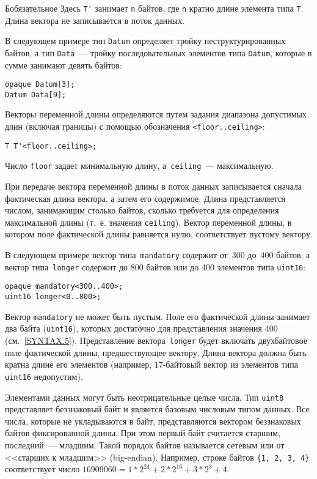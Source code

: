 \begin{appendix}{Б}{обязательное}
Здесь \lstinline{T'} занимает \lstinline{n} байтов, где \lstinline{n} 
кратно длине элемента типа \lstinline{T}. Длина вектора не записывается в 
поток данных.  

В следующем примере тип \lstinline{Datum} определяет тройку неструктурированных
байтов, а тип \lstinline{Data}~--- тройку последовательных элементов типа 
\lstinline{Datum}, которые в сумме занимают девять байтов:  
\begin{lstlisting}
opaque Datum[3];
Datum Data[9];
\end{lstlisting}

Векторы переменной длины определяются путем задания диапазона допустимых 
длин (включая границы) с помощью обозначения \lstinline{<floor..ceiling>}: 
\begin{lstlisting}
T T'<floor..ceiling>;
\end{lstlisting}

Число \lstinline{floor} задает минимальную длину, 
а~\lstinline{ceiling}~--- максимальную.  

При передаче вектора переменной длины в поток данных записывается сначала 
фактическая длина вектора, а затем его содержимое. Длина представляется 
числом, занимающим столько байтов, сколько требуется для определения 
максимальной длины (т.~е. значения \lstinline{ceiling}). Вектор переменной 
длины, в котором поле фактической длины равняется нулю, соответствует 
пустому вектору. 

В следующем примере вектор типа~\lstinline{mandatory} содержит от~300 
до~400 байтов, а вектор типа~\lstinline{longer} содержит до 800 байтов 
или до 400 элементов типа \lstinline{uint16}:
\begin{lstlisting}
opaque mandatory<300..400>;
uint16 longer<0..800>;
\end{lstlisting}

Вектор \lstinline{mandatory} не может быть пустым. 
Поле его фактической длины занимает два байта (\lstinline{uint16}), 
которых достаточно для  представления значения 400 (см.~\ref{SYNTAX.5}). 
%
Представление вектора~\lstinline{longer} будет включать 
двухбайтовое поле фактической длины, предшествующее вектору. Длина 
вектора должна быть кратна длине его элементов (например, 
17-байтовый вектор из элементов типа \lstinline{uint16} недопустим). 

\label{SYNTAX.4}

Элементами данных могут быть неотрицательные целые числа. Тип \lstinline{uint8} 
представляет беззнаковый байт и является базовым числовым типом данных. 
Все числа, которые не укладываются в байт, представляются вектором 
беззнаковых байтов фиксированной длины. При этом первый байт считается 
старшим, последний~--- младшим. Такой порядок байтов называется сетевым или 
от <<старших к младшим>> (big-endian). Например, строке байтов 
\lstinline|{1, 2, 3, 4}|
соответствует число 
$16909060 = 1 * 2^{24} + 2 * 2^{16} + 3 * 2^8 + 4$.


\end{appendix}
